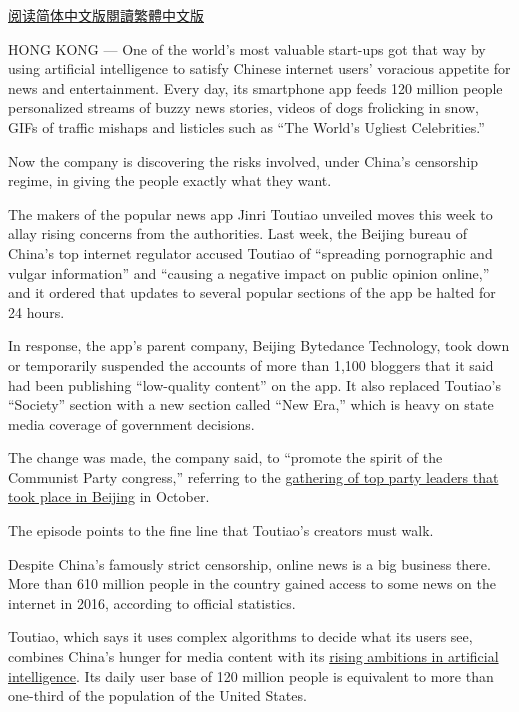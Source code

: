 \href{https://cn.nytimes.com/business/20180103/china-toutiao-censorship/}{阅读简体中文版}\href{https://cn.nytimes.com/business/20180103/china-toutiao-censorship/zh-hant/}{閱讀繁體中文版}

HONG KONG --- One of the world's most valuable start-ups got that way by
using artificial intelligence to satisfy Chinese internet users'
voracious appetite for news and entertainment. Every day, its smartphone
app feeds 120 million people personalized streams of buzzy news stories,
videos of dogs frolicking in snow, GIFs of traffic mishaps and listicles
such as ``The World's Ugliest Celebrities.''

Now the company is discovering the risks involved, under China's
censorship regime, in giving the people exactly what they want.

The makers of the popular news app Jinri Toutiao unveiled moves this
week to allay rising concerns from the authorities. Last week, the
Beijing bureau of China's top internet regulator accused Toutiao of
``spreading pornographic and vulgar information'' and ``causing a
negative impact on public opinion online,'' and it ordered that updates
to several popular sections of the app be halted for 24 hours.

In response, the app's parent company, Beijing Bytedance Technology,
took down or temporarily suspended the accounts of more than 1,100
bloggers that it said had been publishing ``low-quality content'' on the
app. It also replaced Toutiao's ``Society'' section with a new section
called ``New Era,'' which is heavy on state media coverage of government
decisions.

The change was made, the company said, to ``promote the spirit of the
Communist Party congress,'' referring to the
\href{https://www.nytimes.com/2017/10/17/world/asia/xi-jinping-communist-party-china.html}{gathering
of top party leaders that took place in Beijing} in October.

The episode points to the fine line that Toutiao's creators must walk.

Despite China's famously strict censorship, online news is a big
business there. More than 610 million people in the country gained
access to some news on the internet in 2016, according to official
statistics.

Toutiao, which says it uses complex algorithms to decide what its users
see, combines China's hunger for media content with its
\href{https://www.nytimes.com/2017/05/27/technology/china-us-ai-artificial-intelligence.html}{rising
ambitions in artificial intelligence}. Its daily user base of 120
million people is equivalent to more than one-third of the population of
the United States.

